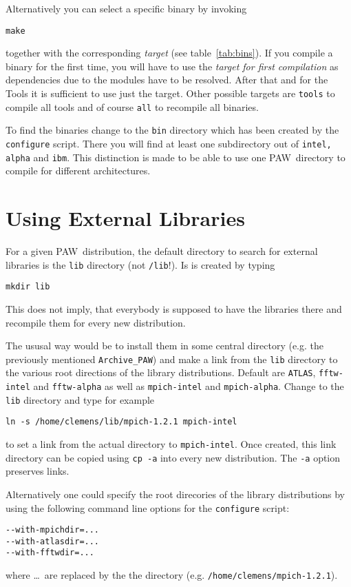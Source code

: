 \documentclass[a4paper,10pt]{article}
\newcommand{\PAW}{\textsc{PAW}}
\begin{document}
Alternatively you can select a specific binary by invoking
\begin{verbatim}
make
\end{verbatim}
together with the corresponding \emph{target} (see table~\ref{tab:bins}).  If
you compile a binary for the first time, you will have to use the \emph{target
for first compilation} as dependencies due to the modules have to be
resolved. After that and for the Tools it is sufficient to use just the target.
Other possible targets are \texttt{tools} to compile all tools and of course
\texttt{all} to recompile all binaries.

To find the binaries change to the \texttt{bin} directory which has been
created by the \texttt{configure} script.  There you will find at least one
subdirectory out of \texttt{intel, alpha} and \texttt{ibm}.  This
distinction is made to be able to use one \PAW\ directory to compile for
different architectures.


\section{Using External Libraries}
\label{sec:libs}

For a given \PAW\ distribution, the default directory to search for external
libraries is the \texttt{lib} directory (not \texttt{/lib}!). Is is created by typing
\begin{verbatim}
mkdir lib
\end{verbatim}
This does not imply, that everybody is supposed to have the libraries there and recompile them for every new distribution.  

The ususal way would be to install them in some central directory (e.g. the
previously mentioned \texttt{Archive\_PAW}) and make a link from the
\texttt{lib} directory to the various root directions of the library distributions.  Default are \texttt{ATLAS},
\texttt{fftw-intel} and \texttt{fftw-alpha} as well as \texttt{mpich-intel} and
\texttt{mpich-alpha}.  Change to the \texttt{lib} directory and type for
example
\begin{verbatim}
ln -s /home/clemens/lib/mpich-1.2.1 mpich-intel
\end{verbatim}
to set a link from the actual directory to
\texttt{mpich-intel}.  Once created, this link directory can be copied using \texttt{cp -a} into every new distribution. The \texttt{-a} option preserves links.


Alternatively one could specify the root direcories of the
library distributions by using the following command line options for the
\texttt{configure} script:
\begin{verbatim}
--with-mpichdir=...
--with-atlasdir=...
--with-fftwdir=...
\end{verbatim}
where \ldots\ are replaced by the the directory (e.g. \texttt{/home/clemens/mpich-1.2.1}).  
\end{document}
